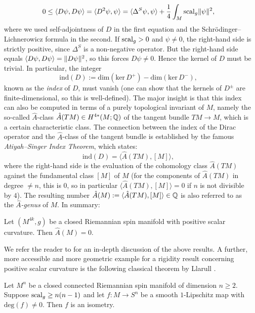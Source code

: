 \[
0 \leq \langle D\psi, D\psi \rangle = \langle D^2\psi, \psi \rangle = \langle \Delta^S\psi, \psi \rangle + \frac{1}{4} \int_M \mathrm{scal}_g \lVert\psi\rVert^2,
\]
where we used self-adjointness of $D$ in the first equation and the Schrödinger--Lichnerowicz formula in the second. If $\mathrm{scal}_g > 0$ and $\psi \neq 0$, the right-hand side is strictly positive, since $\Delta^S$ is a non-negative operator. But the right-hand side equals $\langle D\psi,D\psi\rangle = \lVert D\psi\rVert^2$, so this forces $D\psi \neq 0$. Hence the kernel of $D$ must be trivial. In particular, the integer
\[
\mathrm{ind}(D) := \mathrm{dim}(\mathrm{ker}\,D^+) - \mathrm{dim}(\mathrm{ker}\,D^-),
\]
known as the \textit{index} of $D$, must vanish (one can show that the kernels of $D^\pm$ are finite-dimensional, so this is well-defined). The major insight is that this index can also be computed in terms of a purely topological invariant of $M$, namely the so-called $\hat{A}$-class $\hat{A}(TM) \in H^{4\ast}(M; \mathbb{Q})$ of the tangent bundle $TM \to M$, which is a certain characteristic class. The connection between the index of the Dirac operator and the $\hat{A}$-class of the tangent bundle is established by the famous \textit{Atiyah--Singer Index Theorem}, which states:
\[
\mathrm{ind}(D) = \langle \hat{A}(TM), [M]\rangle ,
\]
where the right-hand side is the evaluation of the cohomology class $\hat{A}(TM)$ against the fundamental class $[M]$ of $M$ (for the components of $\hat{A}(TM)$ in degree $\neq n$, this is $0$, so in particular $\langle \hat{A}(TM), [M]\rangle = 0$ if $n$ is not divisible by $4$). The resulting number $\hat{A}(M) := \langle \hat{A}(TM), [M]\rangle \in \mathbb{Q}$ is also referred to as the \textit{$\hat{A}$-genus} of $M$. In summary:
\begin{theorem}[Lichnerowicz, 1963]
    Let $(M^{4k},g)$ be a closed Riemannian spin manifold with positive scalar curvature. Then $\hat{A}(M) = 0$.
\end{theorem}

We refer the reader to \cite{LawsonMichelsohn1989SpinGeometry} for an in-depth discussion of the above results. A further, more accessible and more geometric example for a rigidity result concerning positive scalar curvature is the following classical theorem by Llarull \cite[Thm. B]{Llarull1998SharpEstimates}.

\begin{theorem}[Llarull, 1998]
    Let $M^n$ be a closed connected Riemannian spin manifold of dimension $n \geq 2$. Suppose $\mathrm{scal}_g \geq n(n-1)$ and let $f\colon M \to S^n$ be a smooth $1$-Lipschitz map with $\mathrm{deg}(f) \neq 0$. Then $f$ is an isometry.
\end{theorem}

